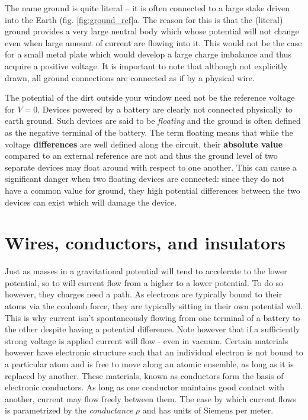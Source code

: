 \documentclass{tufte-book}
\begin{document}
The name ground is quite literal -- it is often connected to a large stake driven into the Earth (fig. \ref{fig:ground_ref}a. The reason for this is that the (literal) ground provides a very large neutral body which whose potential will not change even when large amount of current are flowing into it. This would not be the case for a small metal plate which would develop a large charge imbalance and thus acquire a positive voltage. It is important to note that although not explicitly drawn, all ground connections are connected as if by a physical wire. 

The potential of the dirt outside your window need not be the reference voltage for $V=0$. Devices powered by a battery are clearly not connected physically to earth ground. Such devices are said to be \textit{floating} and the ground is often defined as the negative terminal of the battery. The term floating means that while the voltage \textbf{differences} are well defined along the circuit, their \textbf{absolute value} compared to an external reference are not and thus the ground level of two separate devices may float around with respect to one another. This can cause a significant danger when two floating devices are connected: since they do not have a common value for ground, they high potential differences between the two devices can exist which will damage the device. 

\section{Wires, conductors, and insulators}
Just as masses in a gravitational potential will tend to accelerate to the lower potential, so to will current flow from a higher to a lower potential. To do so however, they charges need a path. As electrons are typically bound to their atoms via the coulomb force, they are typically sitting in their own potential well. This is why current isn't spontaneously flowing from one terminal of a battery to the other despite having a potential difference. Note however that if a sufficiently strong voltage is applied current will flow - even in vacuum. Certain materials however have electronic structure such that an individual electron is not bound to a particular atom and is free to move along an atomic ensemble, as long as it is replaced by another. These materials, known as conductors form the basis of electronic conductors. As long as one conductor maintains good contact with another, current may flow freely between them. The ease by which current flows is parametrized by the \textit{conductance} $\rho$ and has units of Siemens per meter.
\end{document}

